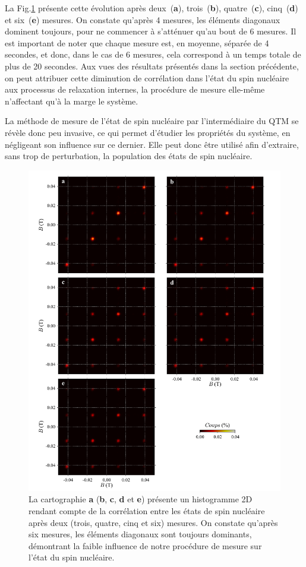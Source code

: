 La Fig.\ref{evolution_mesures} présente cette évolution après deux~(\textbf{a}), trois~(\textbf{b}), quatre~(\textbf{c}), cinq~(\textbf{d}) et six~(\textbf{e}) mesures. On constate qu'après 4 mesures, les éléments diagonaux dominent toujours, pour ne commencer à s'atténuer qu'au bout de 6 mesures. Il est important de noter que chaque mesure est, en moyenne, séparée de 4 secondes, et donc, dans le cas de 6 mesures, cela correspond à un temps totale de plus de 20 secondes. Aux vues des résultats présentés dans la section précédente, on peut attribuer cette diminution de corrélation dans l'état du spin nucléaire aux processus de relaxation internes, la procédure de mesure elle-même n'affectant qu'à la marge le système. 

La méthode de mesure de l'état de spin nucléaire par l'intermédiaire du QTM se révèle donc peu invasive, ce qui permet d'étudier les propriétés du système, en négligeant son influence sur ce dernier. Elle peut donc être utilisé afin d'extraire, sans trop de perturbation, la population des états de spin nucléaire.

\begin{figure}
\includegraphics[scale=0.45]{Resultats/MesureInfl/MesureInfl.pdf} 
\caption{La cartographie \textbf{a} (\textbf{b}, \textbf{c}, \textbf{d} et \textbf{e}) présente un histogramme 2D rendant compte de la corrélation entre les états de spin nucléaire après deux (trois, quatre, cinq et six) mesures. On constate qu'après six mesures, les éléments diagonaux sont toujours dominants, démontrant la faible influence de notre procédure de mesure sur l'état du spin nucléaire.}
\label{evolution_mesures}
\end{figure}

